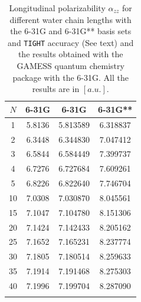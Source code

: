 \documentclass[prl,aps,twocolumn,showpacs,twocolumngrid,superbib]{revtex4}
\begin{document}
\begin{table}[t]
  \centering
  \caption{\protect
    Longitudinal polarizability $\alpha_{zz}$
    for different water chain lengths with the 6-31G and 6-31G** basis sets
    and {\tt TIGHT} accuracy (See text) and the results obtained with
    the GAMESS quantum chemistry package \cite{gamess} with the 6-31G. 
    All the results are in $[a.u.]$.
  }\label{tab:Alpha_1D_Values}
  \begin{tabular}{cccc}
    \toprule
    $N$ &\multicolumn{1}{c}{6-31G\footnotemark[1]}
    &\multicolumn{1}{c}{6-31G\footnotemark[2]}
    &\multicolumn{1}{c}{6-31G**\footnotemark[2]}\\
    \hline
    1 & 5.8136 & 5.813589 & 6.318837     \\
    2 & 6.3448 & 6.344830 & 7.047412     \\
    3 & 6.5844 & 6.584449 & 7.399737     \\
    4 & 6.7276 & 6.727684 & 7.609261     \\
    5 & 6.8226 & 6.822640 & 7.746704     \\
    10 & 7.0308 & 7.030870 & 8.045561     \\
    15 & 7.1047 & 7.104780 & 8.151306     \\
    20 & 7.1424 & 7.142433 & 8.205162     \\
    25 & 7.1652 & 7.165231 & 8.237774     \\
    30 & 7.1805 & 7.180514 & 8.259633     \\
    35 & 7.1914 & 7.191468 & 8.275303     \\
    40 & 7.1996 & 7.199704 & 8.287090     \\
    \botrule
  \end{tabular}
\end{table}
\end{document}
